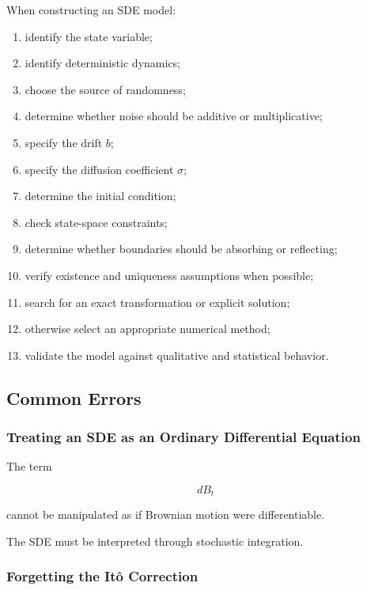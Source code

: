 When constructing an SDE model:

\begin{enumerate}
    \item identify the state variable;
    \item identify deterministic dynamics;
    \item choose the source of randomness;
    \item determine whether noise should be additive or multiplicative;
    \item specify the drift \(b\);
    \item specify the diffusion coefficient \(\sigma\);
    \item determine the initial condition;
    \item check state-space constraints;
    \item determine whether boundaries should be absorbing or reflecting;
    \item verify existence and uniqueness assumptions when possible;
    \item search for an exact transformation or explicit solution;
    \item otherwise select an appropriate numerical method;
    \item validate the model against qualitative and statistical behavior.
\end{enumerate}

\subsection{Common Errors}
\label{subsec:sde-common-errors}

\subsubsection{Treating an SDE as an Ordinary Differential Equation}

The term

\[
dB_t
\]

cannot be manipulated as if Brownian motion were differentiable.

The SDE must be interpreted through stochastic integration.

\subsubsection{Forgetting the It\^o Correction}


